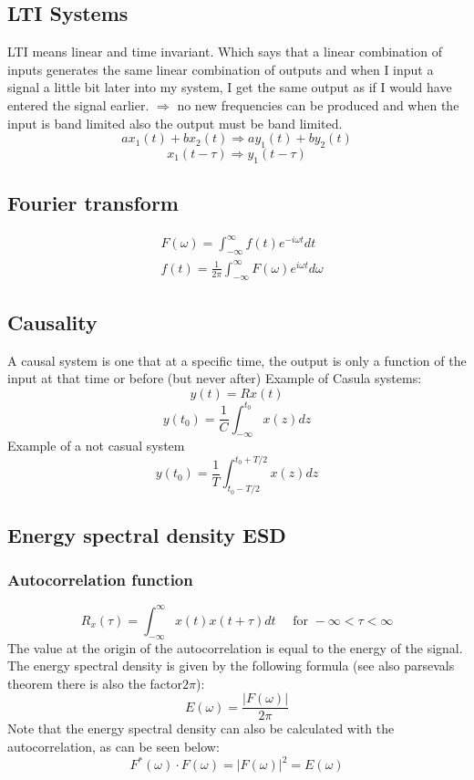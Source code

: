 \subsection{LTI Systems}
LTI means linear and time invariant. Which says that a linear combination of inputs generates the same linear combination of outputs and when I input a signal a little bit later into my system, I get the same output as if I would have entered the signal earlier. $\Rightarrow$ no new frequencies can be produced and when the input is band limited also the output must be band limited.
$$
a x_1(t)+b x_2(t) \Rightarrow a y_1(t)+b y_2(t)
$$
$$
x_1(t-\tau) \Rightarrow y_1(t-\tau)
$$
\subsection{Fourier transform}
$$
\begin{aligned}
&F(\omega)=\int_{-\infty}^{\infty} f(t) e^{-i \omega t} d t \\
&f(t)=\frac{1}{2 \pi} \int_{-\infty}^{\infty} F(\omega) e^{i \omega t} d \omega
\end{aligned}
$$
\subsection{Causality}
A causal system is one that at a specific time, the output is only a function of the input at that time or before (but never after)
Example of Casula systems:
$$
y(t)=R x(t)
$$
$$
y\left(t_0\right)=\frac{1}{C} \int_{-\infty}^{t_0} x(z) d z
$$
Example of a not casual system
$$
y\left(t_0\right)=\frac{1}{T} \int_{t_0-T / 2}^{t_0+T / 2} x(z) d z
$$

\subsection{Energy spectral density ESD}
\subsubsection{Autocorrelation function}
$$
R_x(\tau)=\int_{-\infty}^{\infty} x(t) x(t+\tau) d t \quad \text { for }-\infty<\tau<\infty
$$
The value at the origin of the autocorrelation is equal to the energy of the signal.
The energy spectral density is given by the following formula (see also parsevals theorem there is also the factor$2\pi$):
$$
E(\omega)=\frac{|F(\omega)|}{2 \pi}
$$
Note that the energy spectral density can also be calculated with the autocorrelation, as can be seen below:
$$
F^*(\omega) \cdot F(\omega)=|F(\omega)|^2=E(\omega)
$$

